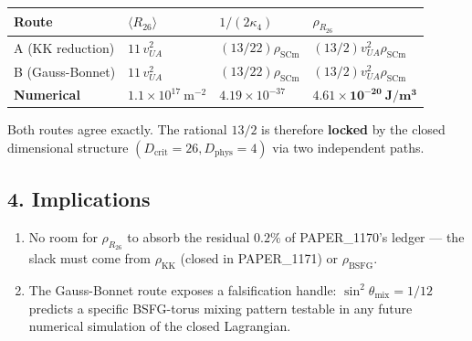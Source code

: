 \documentclass[
]{article}
\newcounter{none} %
\providecommand{\tightlist}{%
  \setlength{\itemsep}{0pt}\setlength{\parskip}{0pt}}
\begin{document}
{\def\LTcaptype{none} %
\begin{longtable}[]{@{}
  >{\raggedright\arraybackslash}p{}
  >{\raggedright\arraybackslash}p{}
  >{\raggedright\arraybackslash}p{}
  >{\raggedright\arraybackslash}p{}@{}}
\toprule\noalign{}
\begin{minipage}[b]{\linewidth}\raggedright
Route
\end{minipage} & \begin{minipage}[b]{\linewidth}\raggedright
\(\langle R_{26}\rangle\)
\end{minipage} & \begin{minipage}[b]{\linewidth}\raggedright
\(1/(2\kappa_4)\)
\end{minipage} & \begin{minipage}[b]{\linewidth}\raggedright
\(\rho_{R_{26}}\)
\end{minipage} \\
\midrule\noalign{}
\endhead
\bottomrule\noalign{}
\endlastfoot
A (KK reduction) & \(11\,v_{UA}^{2}\) & \((13/22)\rho_{\mathrm{SCm}}\) &
\((13/2)v_{UA}^{2}\rho_{\mathrm{SCm}}\) \\
B (Gauss-Bonnet) & \(11\,v_{UA}^{2}\) & \((13/22)\rho_{\mathrm{SCm}}\) &
\((13/2)v_{UA}^{2}\rho_{\mathrm{SCm}}\) \\
\textbf{Numerical} & \(1.1\times 10^{17}\ \mathrm{m^{-2}}\) &
\(4.19\times 10^{-37}\) & \(\mathbf{4.61\times 10^{-20}\ J/m^{3}}\) \\
\end{longtable}
}

Both routes agree exactly. The rational \(13/2\) is therefore
\textbf{locked} by the closed dimensional structure
\((D_{\mathrm{crit}}=26,
D_{\mathrm{phys}}=4)\) via two independent paths.

\subsection{4. Implications}\label{implications}

\begin{enumerate}
\def\labelenumi{\arabic{enumi}.}
\tightlist
\item
  No room for \(\rho_{R_{26}}\) to absorb the residual \(0.2\%\) of
  PAPER\_1170's ledger --- the slack must come from
  \(\rho_{\mathrm{KK}}\) (closed in PAPER\_1171) or
  \(\rho_{\mathrm{BSFG}}\).
\item
  The Gauss-Bonnet route exposes a falsification handle:
  \(\sin^{2}\theta_{\mathrm{mix}}=1/12\) predicts a specific BSFG-torus
  mixing pattern testable in any future numerical simulation of the
  closed Lagrangian.
\end{enumerate}
\end{document}
